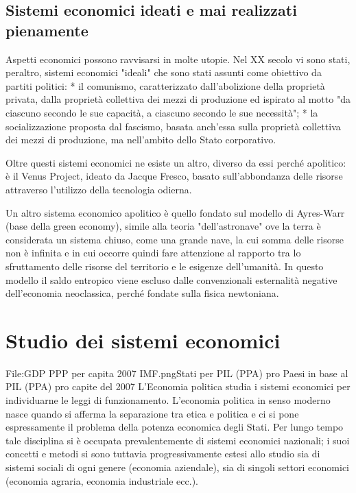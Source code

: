 \subsection{Sistemi economici ideati e mai realizzati pienamente}

Aspetti economici possono ravvisarsi in molte utopie. Nel XX secolo 
vi sono stati, peraltro, sistemi economici "ideali" che sono stati assunti come 
obiettivo da partiti politici:
* il comunismo, caratterizzato dall'abolizione della proprietà privata, 
dalla proprietà collettiva dei mezzi di produzione ed ispirato al motto "da 
ciascuno secondo le sue capacità, a ciascuno secondo le sue necessità";
* la socializzazione proposta dal 
fascismo, basata anch'essa sulla proprietà collettiva dei mezzi di 
produzione, ma nell'ambito dello Stato corporativo.

Oltre questi sistemi economici ne esiste un altro, diverso da essi perché 
apolitico: è il Venus Project, ideato da Jacque 
Fresco, basato sull'abbondanza delle risorse attraverso l'utilizzo della 
tecnologia odierna.

Un altro sistema economico apolitico è quello fondato sul modello di 
Ayres-Warr (base della green economy), simile alla teoria 
"dell'astronave" ove la terra è considerata un sistema chiuso, come una 
grande nave, la cui somma delle risorse non è infinita e in cui occorre quindi 
fare attenzione al rapporto tra lo sfruttamento delle risorse del territorio e 
le esigenze dell'umanità. In questo modello il saldo 
entropico viene escluso dalle convenzionali esternalità negative 
dell'economia neoclassica, perché fondate sulla fisica newtoniana.

\section{Studio dei sistemi economici}


File:GDP PPP per capita 2007 IMF.pngStati per PIL (PPA) pro 
Paesi in base al PIL (PPA) pro capite del 2007
L'Economia politica studia i sistemi economici per individuarne le leggi di 
funzionamento. L'economia politica in senso moderno nasce quando si afferma 
la separazione tra etica e politica e ci si pone espressamente il problema 
della potenza economica degli Stati. Per lungo tempo tale disciplina 
si è occupata prevalentemente di sistemi economici nazionali;
i suoi concetti e metodi si sono tuttavia 
progressivamente estesi allo studio sia di sistemi sociali di ogni genere 
(economia aziendale), sia di singoli settori economici (economia 
agraria, economia industriale ecc.).

